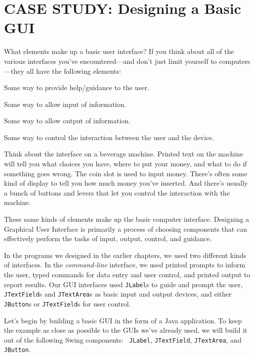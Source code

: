 \section{CASE STUDY: Designing a Basic GUI}
\label{casestudy-designinga-basic-gui}
\noindent What elements make up a basic user interface?  If you think about all
of the various interfaces you've encountered---and don't just limit
yourself to computers---they all have the following elements:

\begin{BL}
\item  Some way to provide help/guidance to the user.
\item  Some way to allow input of information.
\item  Some way to allow output of information.
\item  Some way to control the interaction between the user and the device.
\end{BL}

\noindent Think about the interface on a beverage machine.
Printed text on the machine will tell you what choices you have, where
to put your money, and what to do if something goes wrong.   The coin
slot is used to input money.  There's often some kind of display to
tell you how much money you've inserted.  And there's usually a bunch
of buttons and levers that let you control the interaction with the
machine.

These same kinds of elements make up the basic computer interface.
Designing a Graphical User Interface is primarily a process of
choosing components that can effectively perform the tasks of input,
output, control, and guidance.


In the programs we designed in the earlier chapters, we used two
different kinds of interfaces.  In the {\it command-line} interface, we
used printed prompts to inform the user, typed commands for data
entry and user control, and printed output to report results.  Our
GUI interfaces used {\tt JLabel}s to guide and prompt the user,
{\tt JTextField}s and {\tt JTextArea}s as basic input and output devices, and
either {\tt JButton}s or {\tt JTextField}s for user control.

Let's begin by building a basic GUI in the form of a Java application.
To keep the example as close as possible to the GUIs we've already
used, we will build it out of the following Swing components: {\tt
JLabel}, {\tt JTextField}, {\tt JTextArea}, and {\tt JButton}.

